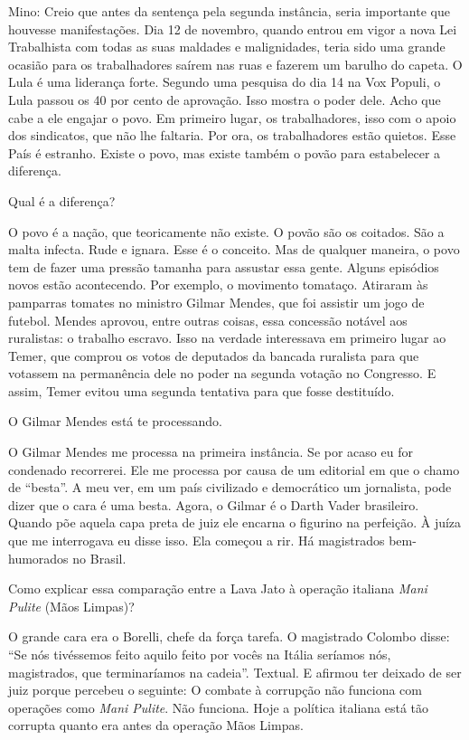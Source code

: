 Mino: Creio que antes da sentença pela segunda instância, seria
importante que houvesse manifestações. Dia 12 de novembro, quando entrou
em vigor a nova Lei Trabalhista com todas as suas maldades e
malignidades, teria sido uma grande ocasião para os trabalhadores saírem
nas ruas e fazerem um barulho do capeta. O Lula é uma liderança forte.
Segundo uma pesquisa do dia 14 na Vox Populi, o Lula passou os 40 por
cento de aprovação. Isso mostra o poder dele. Acho que cabe a ele
engajar o povo. Em primeiro lugar, os trabalhadores, isso com o apoio
dos sindicatos, que não lhe faltaria. Por ora, os trabalhadores estão
quietos. Esse País é estranho. Existe o povo, mas existe também o povão
para estabelecer a diferença.

\falaG Qual é a diferença?

\falaM O povo é a nação, que teoricamente não existe. O povão são os
coitados. São a malta infecta. Rude e ignara. Esse é o conceito. Mas de
qualquer maneira, o povo tem de fazer uma pressão tamanha para assustar
essa gente. Alguns episódios novos estão acontecendo. Por exemplo, o
movimento tomataço. Atiraram às pamparras tomates no ministro Gilmar
Mendes, que foi assistir um jogo de futebol. Mendes aprovou, entre
outras coisas, essa concessão notável aos ruralistas: o trabalho
escravo. Isso na verdade interessava em primeiro lugar ao Temer, que
comprou os votos de deputados da bancada ruralista para que votassem na
permanência dele no poder na segunda votação no Congresso. E assim,
Temer evitou uma segunda tentativa para que fosse destituído.

\falaG O Gilmar Mendes está te processando.

\falaM O Gilmar Mendes me processa na primeira instância. Se por acaso eu
for condenado recorrerei. Ele me processa por causa de um editorial em
que o chamo de ``besta''. A meu ver, em um país civilizado e democrático
um jornalista, pode dizer que o cara é uma besta. Agora, o Gilmar é o
Darth Vader brasileiro. Quando põe aquela capa preta de juiz ele encarna
o figurino na perfeição. À juíza que me interrogava eu disse isso. Ela
começou a rir. Há magistrados bem-humorados no Brasil.

\falaG Como explicar essa comparação entre a Lava Jato à operação italiana
\emph{Mani Pulite} (Mãos Limpas)?

\falaM O grande cara era o Borelli, chefe da força tarefa. O magistrado
Colombo disse: ``Se nós tivéssemos feito aquilo feito por vocês na
Itália seríamos nós, magistrados, que terminaríamos na cadeia''.
Textual. E afirmou ter deixado de ser juiz porque percebeu o seguinte: O
combate à corrupção não funciona com operações como \emph{Mani Pulite}.
Não funciona. Hoje a política italiana está tão corrupta quanto era
antes da operação Mãos Limpas.

